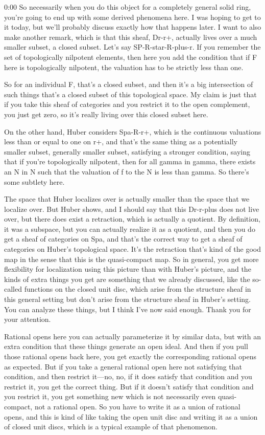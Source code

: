 \begin{unfinished}{0:00}
So necessarily when you do this object for a completely general solid ring, you're going to end up with some derived phenomena here. I was hoping to get to it today, but we'll probably discuss exactly how that happens later. I want to also make another remark, which is that this sheaf, Dr-r+, actually lives over a much smaller subset, a closed subset. Let's say SP-R-star-R-plus-r. If you remember the set of topologically nilpotent elements, then here you add the condition that if F here is topologically nilpotent, the valuation has to be strictly less than one. 

So for an individual F, that's a closed subset, and then it's a big intersection of such things that's a closed subset of this topological space. My claim is just that if you take this sheaf of categories and you restrict it to the open complement, you just get zero, so it's really living over this closed subset here.

On the other hand, Huber considers Spa-R-r+, which is the continuous valuations less than or equal to one on r+, and that's the same thing as a potentially smaller subset, generally smaller subset, satisfying a stronger condition, saying that if you're topologically nilpotent, then for all gamma in gamma, there exists an N in N such that the valuation of f to the N is less than gamma. So there's some subtlety here.

The space that Huber localizes over is actually smaller than the space that we localize over. But Huber shows, and I should say that this Dr-r-plus does not live over, but there does exist a retraction, which is actually a quotient. By definition, it was a subspace, but you can actually realize it as a quotient, and then you do get a sheaf of categories on Spa, and that's the correct way to get a sheaf of categories on Huber's topological space. It's the retraction that's kind of the good map in the sense that this is the quasi-compact map. So in general, you get more flexibility for localization using this picture than with Huber's picture, and the kinds of extra things you get are something that we already discussed, like the so-called functions on the closed unit disc, which arise from the structure sheaf in this general setting but don't arise from the structure sheaf in Huber's setting. You can analyze these things, but I think I've now said enough. Thank you for your attention.

Rational opens here you can actually parameterize it by similar data, but with an extra condition that these things generate an open ideal. And then if you pull those rational opens back here, you get exactly the corresponding rational opens as expected. But if you take a general rational open here not satisfying that condition, and then restrict it---no, no, if it does satisfy that condition and you restrict it, you get the correct thing. But if it doesn't satisfy that condition and you restrict it, you get something new which is not necessarily even quasi-compact, not a rational open. So you have to write it as a union of rational opens, and this is kind of like taking the open unit disc and writing it as a union of closed unit discs, which is a typical example of that phenomenon.


\end{unfinished}
